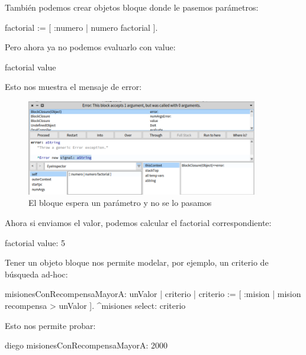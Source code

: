 \documentclass[a4paper,12pt]{book}
\begin{document}
También podemos crear objetos bloque donde le pasemos parámetros:

\begin{code}
factorial := [ :numero | numero factorial ].
\end{code}


Pero ahora ya no podemos evaluarlo con value:

\begin{code}
factorial value
\end{code}

Esto nos muestra el mensaje de error:

\begin{figure}[h!]
    \centering	
    \includegraphics[width=0.9\textwidth]{images/17_error_bloque.png}
    \caption{El bloque espera un parámetro y no se lo pasamos}
\end{figure}
\FloatBarrier

Ahora si enviamos el valor, podemos calcular el factorial correspondiente:

\begin{code}
factorial value: 5
\end{code}

Tener un objeto bloque nos permite modelar, por ejemplo, un criterio de búsqueda ad-hoc:

\begin{code}
misionesConRecompensaMayorA: unValor
  | criterio |
  criterio := [ :mision | mision recompensa > unValor ].
  ^misiones select: criterio 
\end{code}

Esto nos permite probar:

\begin{code}
diego misionesConRecompensaMayorA: 2000
\end{code}
\end{document}
